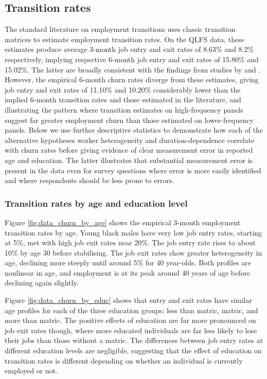 \documentclass[letterpaper,12pt,final,dvipsnames]{article}
\begin{document}
\subsection{Transition rates} \label{sec_data_transition_rates} 

The standard literature on employment transitions uses classic transition matrices to estimate employment transition rates. On the QLFS data, these estimates produce average 3-month job entry and exit rates of 8.63\% and 8.2\% respectively, implying respective 6-month job entry and exit rates of 15.80\% and 15.02\%. The latter are broadly consistent with the findings from studies by \cite{banerjee2008} and \cite{cichello2014}. However, the empirical 6-month churn rates diverge from these estimates, giving job entry and exit rates of 11.10\% and 10.20\% \textemdash considerably lower than the implied 6-month transition rates and those estimated in the literature, and illustrating the pattern where transition estimates on high-frequency panels suggest far greater employment churn than those estimated on lower-frequency panels. Below we use further descriptive statistics to demonstrate how each of the alternative hypotheses \textemdash worker heterogeneity and duration-dependence \textemdash correlate with churn rates before giving evidence of clear measurement error in reported age and education. The latter illustrates that substantial measurement error is present in the data even for survey questions where error is more easily identified and where respondents should be less prone to errors.

\subsubsection{Transition rates by age and education level}

Figure \ref{fig:data_churn_by_age} shows the empirical 3-month employment transition rates by age. Young black males have very low job entry rates, starting at 5\%, met with high job exit rates near 20\%. The job entry rate rises to about 10\% by age 30 before stabilising. The job exit rates show greater heterogeneity in age, declining more steeply until around 5\% for 40 year-olds. Both profiles are nonlinear in age, and employment is at its peak around 40 years of age before declining again slightly. 

Figure \ref{fig:data_churn_by_educ} shows that entry and exit rates have similar age profiles for each of the three education groups: less than matric, matric, and more than matric. The positive effects of education are far more pronounced on job exit rates though, where more educated individuals are far less likely to lose their jobs than those without a matric. The differences between job entry rates at different education levels are negligible, suggesting that the effect of education on transition rates is different depending on whether an individual is currently employed or not. 
\end{document}
